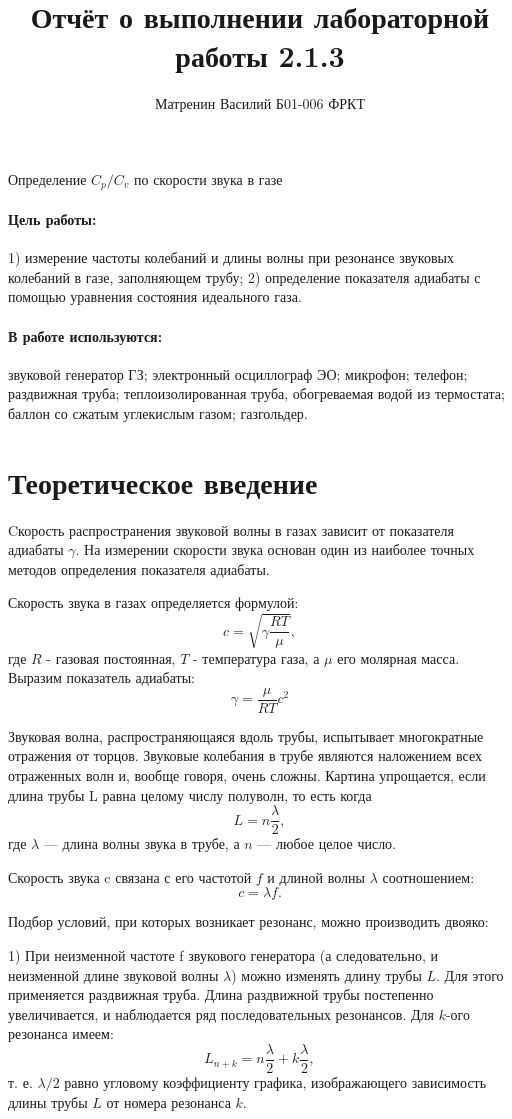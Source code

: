 \documentclass[11pt,a4paper,oneside]{article}
\author{Матренин Василий Б01-006 ФРКТ}
\title{Отчёт о выполнении лабораторной работы 2.1.3}
\begin{document}
	\maketitle
	\begin{center}
		{\Large Определение $C_p/C_v$ по скорости звука в газе}
	\end{center}
	\paragraph*{Цель работы:} 1) измерение частоты
	колебаний
	и длины волны при
	резонансе звуковых
	колебаний в газе, заполняющем трубу; 2) определение показателя адиабаты с помощью уравнения состояния идеального газа.
	\paragraph*{В работе используются:} звуковой генератор ГЗ; электронный
	осциллограф ЭО; микрофон; телефон; раздвижная труба; теплоизолированная труба, обогреваемая водой из термостата; баллон
	со сжатым углекислым газом; газгольдер.
	\section{Теоретическое введение}
	
		Cкорость распространения звуковой волны в газах зависит от показателя адиабаты $\gamma$. На измерении скорости звука основан один из наиболее  точных методов определения показателя  адиабаты.
		
		Скорость звука в газах определяется формулой:
		$$c=\sqrt{\gamma\frac{RT}{\mu}},$$
		где $R$ - газовая постоянная, $T$ - температура газа, а $\mu$ его молярная масса. Выразим показатель адиабаты:
		$$\gamma=\frac{\mu}{RT} c^2$$
		
		Звуковая волна, распространяющаяся вдоль трубы, испытывает многократные отражения от торцов. Звуковые колебания в трубе являются наложением всех отраженных волн и, вообще говоря, очень сложны. Картина упрощается, если длина трубы L равна целому числу полуволн, то есть когда
		$$L=n\frac{\lambda}{2},$$
		где $\lambda$ — длина волны звука в трубе, а $n$ — любое целое число.
		
		Скорость звука c связана с его частотой $f$ и длиной волны $\lambda$ соотношением:
		$$c=\lambda f.$$
		
		Подбор условий, при которых возникает резонанс, можно производить двояко:
		
		1) При неизменной частоте f звукового генератора (а следовательно, и неизменной длине звуковой волны $\lambda$) можно изменять длину трубы $L$. Для этого применяется раздвижная труба. Длина раздвижной трубы постепенно увеличивается, и наблюдается ряд последовательных резонансов. Для $k$-ого резонанса имеем:
		$$L_{n+k}=n\frac{\lambda}{2} + k\frac{\lambda}{2},$$
		т. е. $\lambda/2$ равно угловому коэффициенту графика, изображающего зависимость длины трубы $L$ от номера резонанса $k$.
		
\end{document}
